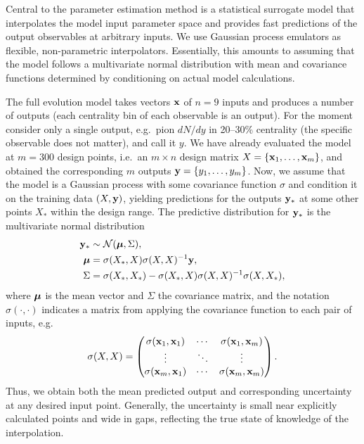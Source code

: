 \documentclass[aps,prc,reprint,amsmath,nofootinbib,superscriptaddress]{revtex4-1}
\begin{document}
Central to the parameter estimation method is a statistical surrogate model that interpolates the model input parameter space and provides fast predictions of the output observables at arbitrary inputs.
We use Gaussian process emulators \cite{Rasmussen:2006gp} as flexible, non-parametric interpolators.
Essentially, this amounts to assuming that the model follows a multivariate normal distribution with mean and covariance functions determined by conditioning on actual model calculations.

The full evolution model takes vectors $\mathbf x$ of $n = 9$ inputs and produces a number of outputs (each centrality bin of each observable is an output).
For the moment consider only a single output, e.g.\ pion $dN/dy$ in \mbox{20--30\%} centrality (the specific observable does not matter), and call it $y$.
We have already evaluated the model at $m = 300$ design points, i.e.\ an $m \times n$ design matrix $X = \{\mathbf x_1, \ldots, \mathbf x_m\}$, and obtained the corresponding $m$ outputs $\mathbf y = \{y_1, \ldots, y_m\}$.
Now, we assume that the model is a Gaussian process with some covariance function $\sigma$ and condition it on the training data $(X, \mathbf y)$, yielding predictions for the outputs $\mathbf y_*$ at some other points $X_*$ within the design range.
The predictive distribution for $\mathbf y_*$ is the multivariate normal distribution
\begin{equation}
  \begin{aligned}
    \mathbf y_* &\sim \mathcal N(\boldsymbol\mu, \Sigma), \\
    \boldsymbol\mu &= \sigma(X_*, X)\sigma(X, X)^{-1}\mathbf y, \\
    \Sigma &= \sigma(X_*,X_*) - \sigma(X_*,X)\sigma(X,X)^{-1}\sigma(X,X_*),
  \end{aligned}
\end{equation}
where $\boldsymbol\mu$ is the mean vector and $\Sigma$ the covariance matrix, and the notation $\sigma(\cdot, \cdot)$ indicates a matrix from applying the covariance function to each pair of inputs, e.g.
\begin{equation}
  \sigma(X, X) =
  \begin{pmatrix}
    \sigma(\mathbf x_1, \mathbf x_1) & \cdots & \sigma(\mathbf x_1, \mathbf x_m) \\
    \vdots & \ddots & \vdots \\
    \sigma(\mathbf x_m, \mathbf x_1) & \cdots & \sigma(\mathbf x_m, \mathbf x_m) \\
  \end{pmatrix}.
\end{equation}
Thus, we obtain both the mean predicted output and corresponding uncertainty at any desired input point.
Generally, the uncertainty is small near explicitly calculated points and wide in gaps, reflecting the true state of knowledge of the interpolation.
\end{document}
